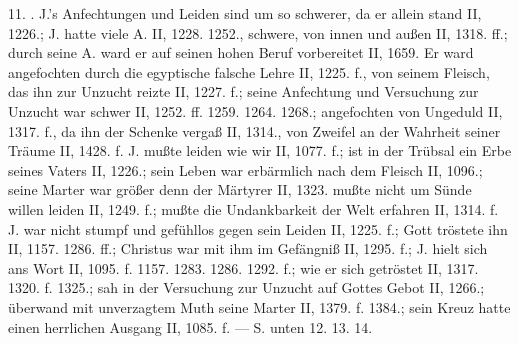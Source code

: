 11. . J.’s Anfechtungen und Leiden sind um so schwerer, da er allein stand II, 1226.; J. hatte viele A. II, 1228. 1252., schwere, von innen und außen II, 1318. ff.; durch seine A. ward er auf seinen hohen Beruf vorbereitet II, 1659. Er ward angefochten durch die egyptische falsche Lehre II, 1225. f., von seinem Fleisch, das ihn zur Unzucht reizte II, 1227. f.; seine Anfechtung und Versuchung zur Unzucht war schwer II, 1252. ff. 1259. 1264. 1268.; angefochten von Ungeduld II, 1317. f., da ihn der Schenke vergaß II, 1314., von Zweifel an der Wahrheit seiner Träume II, 1428. f. J. mußte  leiden wie wir II, 1077. f.; ist in der Trübsal ein Erbe seines Vaters II, 1226.; sein Leben war erbärmlich nach dem Fleisch II, 1096.; seine Marter war größer denn der Märtyrer II, 1323. mußte nicht um Sünde willen leiden II, 1249. f.; mußte die Undankbarkeit der Welt erfahren II, 1314. f. J. war nicht stumpf und gefühllos gegen sein Leiden II, 1225. f.; Gott tröstete ihn II, 1157. 1286. ff.; Christus war mit ihm im Gefängniß II, 1295. f.; J. hielt sich ans Wort II, 1095. f. 1157. 1283. 1286. 1292. f.; wie er sich getröstet II, 1317. 1320. f. 1325.; sah in der Versuchung zur Unzucht auf Gottes Gebot II, 1266.; überwand mit unverzagtem Muth seine Marter II, 1379. f. 1384.; sein Kreuz hatte einen herrlichen Ausgang II, 1085. f. — S. unten 12. 13. 14.

